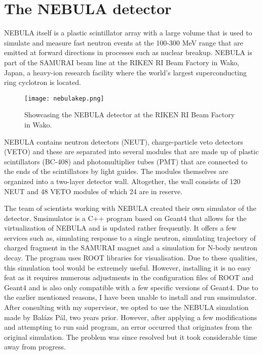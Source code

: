 \documentclass[12pt,twocolumn]{article}
\begin{document}
\section{The NEBULA detector}

NEBULA itself is a plastic scintillator array with a large volume that is used to simulate and measure fast neutron events at the 100-300 MeV range that are emitted at forward directions in processes such as nuclear breakup. \cite{nebula} NEBULA is part of the SAMURAI beam line at the RIKEN RI Beam Factory in Wako, Japan, a heavy-ion research facility where the world's largest superconducting ring cyclotron is located. \cite{RI}

\begin{figure}[H]
    \centering
    \texttt{[image: nebulakep.png]}
    \caption{Showcasing the NEBULA detector at the RIKEN RI Beam Factory in Wako. \cite{nebula}}
\end{figure}

NEBULA contains neutron detectors (NEUT), charge-particle veto detectors (VETO) and these are separated into several modules that are made up of plastic scintillators (BC-408) and photomultiplier tubes (PMT) that are connected to the ends of the scintillators by light guides. The modules themselves are organized into a two-layer detector wall. Altogether, the wall consists of 120 NEUT and 48 VETO modules of which 24 are in reserve. \cite{nebula}

The team of scientists working with NEBULA created their own simulator of the detector. Smsimulator is a C++ program based on Geant4 that allows for the virtualization of NEBULA and is updated rather frequently. \cite{smsim} It offers a few services such as, simulating response to a single neutron, simulating trajectory of charged fragment in the SAMURAI magnet and a simulation for N-body neutron decay. The program uses ROOT libraries for visualisation. Due to these qualities, this simulation tool would be extremely useful. However, installing it is no easy feat as it requires numerous adjustments in the configuration files of ROOT and Geant4 and is also only compatible with a few specific versions of Geant4. Due to the earlier mentioned reasons, I have been unable to install and run smsimulator. After consulting with my supervisor, we opted to use the NEBULA simulation made by Balázs Pál, two years prior. \cite{masterdesky} However, after applying a few modifications and attempting to run said program, an error occurred that originates from the original simulation. The problem was since resolved but it took considerable time away from progress.
\end{document}
